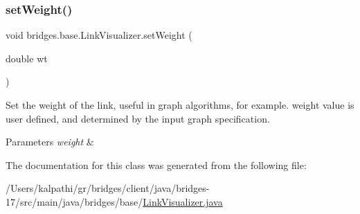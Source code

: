\subsubsection{\texorpdfstring{set\+Weight()}{setWeight()}}
{\footnotesize\ttfamily void bridges.\+base.\+Link\+Visualizer.\+set\+Weight (\begin{DoxyParamCaption}\item[{double}]{wt }\end{DoxyParamCaption})}

Set the weight of the link, useful in graph algorithms, for example. weight value is user defined, and determined by the input graph specification.


\begin{DoxyParams}{Parameters}
{\em weight} & \\
\hline
\end{DoxyParams}


The documentation for this class was generated from the following file\+:\begin{DoxyCompactItemize}
\item 
/\+Users/kalpathi/gr/bridges/client/java/bridges-\/17/src/main/java/bridges/base/\mbox{\hyperlink{_link_visualizer_8java}{Link\+Visualizer.\+java}}\end{DoxyCompactItemize}
